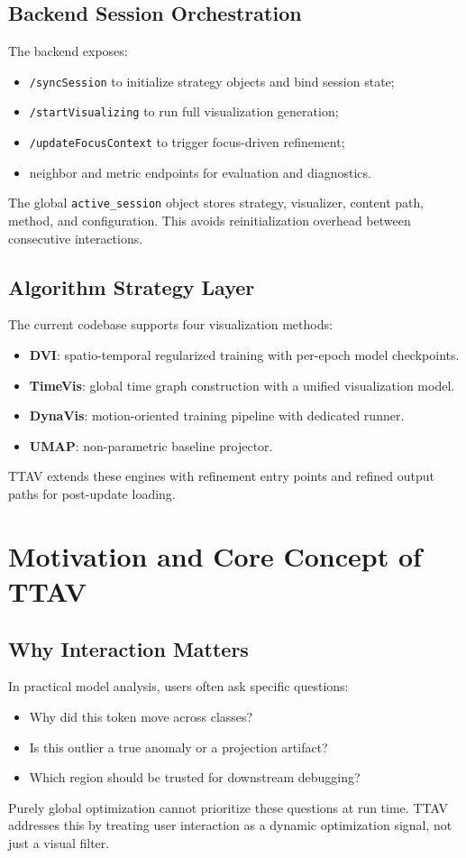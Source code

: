 \documentclass[12pt,a4paper]{report}
\newcommand{\systemname}{TTAV}
\begin{document}
\section{Backend Session Orchestration}
The backend exposes:
\begin{itemize}
\item \texttt{/syncSession} to initialize strategy objects and bind session state;
\item \texttt{/startVisualizing} to run full visualization generation;
\item \texttt{/updateFocusContext} to trigger focus-driven refinement;
\item neighbor and metric endpoints for evaluation and diagnostics.
\end{itemize}
The global \texttt{active\_session} object stores strategy, visualizer, content path, method, and configuration. This avoids reinitialization overhead between consecutive interactions.

\section{Algorithm Strategy Layer}
The current codebase supports four visualization methods:
\begin{itemize}
\item \textbf{DVI}: spatio-temporal regularized training with per-epoch model checkpoints.
\item \textbf{TimeVis}: global time graph construction with a unified visualization model.
\item \textbf{DynaVis}: motion-oriented training pipeline with dedicated runner.
\item \textbf{UMAP}: non-parametric baseline projector.
\end{itemize}
\systemname{} extends these engines with refinement entry points and refined output paths for post-update loading.

\chapter{Motivation and Core Concept of TTAV}
\section{Why Interaction Matters}
In practical model analysis, users often ask specific questions:
\begin{itemize}
\item Why did this token move across classes?
\item Is this outlier a true anomaly or a projection artifact?
\item Which region should be trusted for downstream debugging?
\end{itemize}
Purely global optimization cannot prioritize these questions at run time. \systemname{} addresses this by treating user interaction as a dynamic optimization signal, not just a visual filter.
\end{document}
